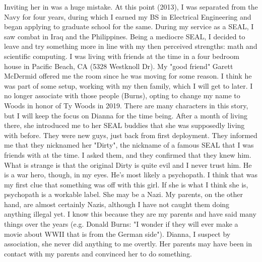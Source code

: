 \documentclass[a4paper]{arthur-letter}
\begin{document}
\begin{letter}
            Inviting her in was a huge mistake. At this point (2013), I was separated from the Navy for four years, during which I earned my BS in Electrical Engineering and began applying to graduate school for the same. During my service as a SEAL, I saw combat in Iraq and the Philippines. Being a mediocre SEAL, I decided to leave and try something more in line with my then perceived strengths: math and scientific computing. I was living with friends at the time in a four bedroom house in Pacific Beach, CA (5328 Westknoll Dr). My "good friend" Garett McDermid offered me the room since he was moving for some reason. I think he was part of some setup, working with my then family, which I will get to later. I no longer associate with those people (Burns), opting to change my name to Woods in honor of Ty Woods in 2019. There are many characters in this story, but I will keep the focus on Dianna for the time being. After a month of living there, she introduced me to her SEAL buddies that she was supposedly living with before. They were new guys, just back from first deployment. They informed me that they nicknamed her "Dirty", the nickname of a famous SEAL that I was friends with at the time. I asked them, and they confirmed that they knew him. What is strange is that the original Dirty is quite evil and I never trust him. He is a war hero, though, in my eyes. He's most likely a psychopath. I think that was my first clue that something was off with this girl. If she is what I think she is, psychopath is a workable label. She may be a Nazi. My parents, on the other hand, are almost certainly Nazis, although I have not caught them doing anything illegal yet. I know this because they are my parents and have said many things over the years (e.g. Donald Burns: "I wonder if they will ever make a movie about WWII that is from the German side"). Dianna, I suspect by association, she never did anything to me overtly. Her parents may have been in contact with my parents and convinced her to do something. \\
            

\end{letter}
\end{document}
